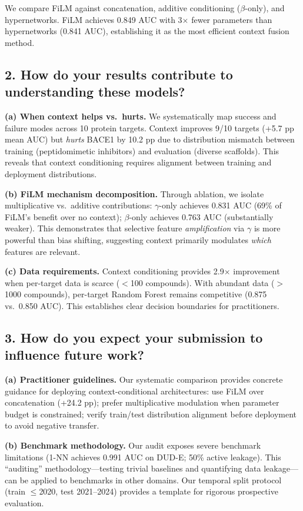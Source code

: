 \documentclass{article}
\begin{document}
We compare FiLM against concatenation, additive conditioning ($\beta$-only), and hypernetworks. FiLM achieves 0.849 AUC with 3$\times$ fewer parameters than hypernetworks (0.841 AUC), establishing it as the most efficient context fusion method.

\subsection*{2. How do your results contribute to understanding these models?}

\textbf{(a) When context helps vs.\ hurts.} We systematically map success and failure modes across 10 protein targets. Context improves 9/10 targets (+5.7 pp mean AUC) but \textit{hurts} BACE1 by 10.2 pp due to distribution mismatch between training (peptidomimetic inhibitors) and evaluation (diverse scaffolds). This reveals that context conditioning requires alignment between training and deployment distributions.

\textbf{(b) FiLM mechanism decomposition.} Through ablation, we isolate multiplicative vs.\ additive contributions: $\gamma$-only achieves 0.831 AUC (69\% of FiLM's benefit over no context); $\beta$-only achieves 0.763 AUC (substantially weaker). This demonstrates that selective feature \textit{amplification} via $\gamma$ is more powerful than bias shifting, suggesting context primarily modulates \textit{which} features are relevant.

\textbf{(c) Data requirements.} Context conditioning provides 2.9$\times$ improvement when per-target data is scarce ($<$100 compounds). With abundant data ($>$1000 compounds), per-target Random Forest remains competitive (0.875 vs.\ 0.850 AUC). This establishes clear decision boundaries for practitioners.

\subsection*{3. How do you expect your submission to influence future work?}

\textbf{(a) Practitioner guidelines.} Our systematic comparison provides concrete guidance for deploying context-conditional architectures: use FiLM over concatenation (+24.2 pp); prefer multiplicative modulation when parameter budget is constrained; verify train/test distribution alignment before deployment to avoid negative transfer.

\textbf{(b) Benchmark methodology.} Our audit exposes severe benchmark limitations (1-NN achieves 0.991 AUC on DUD-E; 50\% active leakage). This ``auditing'' methodology---testing trivial baselines and quantifying data leakage---can be applied to benchmarks in other domains. Our temporal split protocol (train $\leq$2020, test 2021--2024) provides a template for rigorous prospective evaluation.
\end{document}
